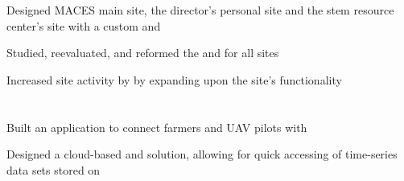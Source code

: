 \documentclass[]{hackathons}
\begin{document}
\begin{minipage}[t]{0.64\textwidth}
\begin{tightemize}
\item Designed MACES main site, the director's personal site and the stem resource center's site with a custom  and 
\item Studied, reevaluated, and reformed the  and  for all sites
\item Increased site activity by  by expanding upon the site's functionality
\end{tightemize}
\small


\section{}
\begin{tightemize}
\item Built an application to connect farmers and UAV pilots with 
\item Designed a cloud-based  and  solution, allowing for quick accessing of time-series data sets stored on 
\end{tightemize}
\medskip

%
%

\end{minipage} 
\hfill
\end{document}
